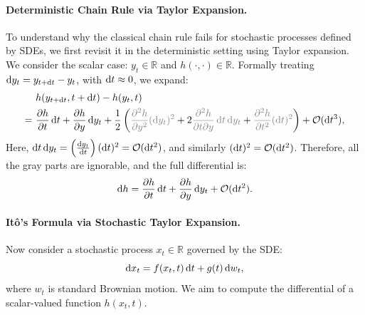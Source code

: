 \paragraph{Deterministic Chain Rule via Taylor Expansion.}
To understand why the classical chain rule fails for stochastic processes defined by SDEs, we first revisit it in the deterministic setting using Taylor expansion. We consider the scalar case: $y_t \in \mathbb{R}$ and $h(\cdot,\cdot)\in \mathbb{R}$. Formally treating $\mathop{}\!\mathrm{d} y_t = y_{t+\mathop{}\!\mathrm{d} t} - y_t$, with $\mathop{}\!\mathrm{d} t \approx 0$, we expand:
\begin{align*}
&h(y_{t+\diff t}, t+\diff t) 
- h(y_t, t) \\
= ~&\frac{\partial h}{\partial t} \diff t
+ \frac{\partial h}{\partial y} \diff y_t  + \frac{1}{2} \left(\textcolor{gray}{\frac{\partial^2 h}{\partial y^2}  (\diff y_t)^2}
+ 2 \textcolor{gray}{\frac{\partial^2 h}{\partial t \partial y} \diff t \diff y_t}
+  \textcolor{gray}{\frac{\partial^2 h}{\partial t^2} (\diff t)^2}
\right)
+ \mathcal{O}(\diff t^3),
\end{align*}
Here, $\mathop{}\!\mathrm{d} t \mathop{}\!\mathrm{d} y_t = \left(\frac{\mathop{}\!\mathrm{d} y_t}{\mathop{}\!\mathrm{d} t}\right)(\mathop{}\!\mathrm{d} t)^2 = \mathcal{O}(\mathop{}\!\mathrm{d} t^2)$, and similarly $(\mathop{}\!\mathrm{d} t)^2 = \mathcal{O}(\mathop{}\!\mathrm{d} t^2)$. Therefore, all the gray parts are ignorable, and the full differential is:
\[
\mathop{}\!\mathrm{d} h
= \frac{\partial h}{\partial t} \mathop{}\!\mathrm{d} t
+ \frac{\partial h}{\partial y} \mathop{}\!\mathrm{d} y_t
+ \mathcal{O}(\mathop{}\!\mathrm{d} t^2).
\]

\paragraph{It\^o's Formula via Stochastic Taylor Expansion.}
Now consider a stochastic process $x_t \in \mathbb{R}$ governed by the SDE:
\[
\mathop{}\!\mathrm{d} x_t = f(x_t, t) \mathop{}\!\mathrm{d} t + g(t) \mathop{}\!\mathrm{d} w_t,
\]
where $w_t$ is standard Brownian motion. We aim to compute the differential of a scalar-valued function $h(x_t, t)$.

